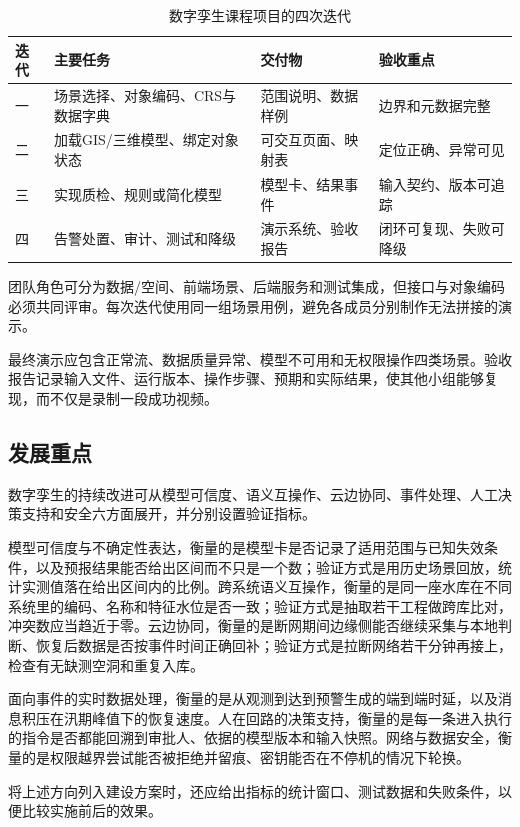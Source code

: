 \begin{table}[htbp]
\centering
\caption{数字孪生课程项目的四次迭代}
\label{tab:dt-course-iterations}
\begin{tabular}{p{1.8cm}p{4.0cm}p{4.1cm}p{3.3cm}}
\toprule
迭代 & 主要任务 & 交付物 & 验收重点 \\
\midrule
一 & 场景选择、对象编码、CRS与数据字典 & 范围说明、数据样例 & 边界和元数据完整 \\
二 & 加载GIS/三维模型、绑定对象状态 & 可交互页面、映射表 & 定位正确、异常可见 \\
三 & 实现质检、规则或简化模型 & 模型卡、结果事件 & 输入契约、版本可追踪 \\
四 & 告警处置、审计、测试和降级 & 演示系统、验收报告 & 闭环可复现、失败可降级 \\
\bottomrule
\end{tabular}
\end{table}

团队角色可分为数据/空间、前端场景、后端服务和测试集成，但接口与对象编码必须共同评审。每次迭代使用同一组场景用例，避免各成员分别制作无法拼接的演示。

最终演示应包含正常流、数据质量异常、模型不可用和无权限操作四类场景。验收报告记录输入文件、运行版本、操作步骤、预期和实际结果，使其他小组能够复现，而不仅是录制一段成功视频。

\subsection{发展重点}

数字孪生的持续改进可从模型可信度、语义互操作、云边协同、事件处理、人工决策支持和安全六方面展开，并分别设置验证指标。

模型可信度与不确定性表达，衡量的是模型卡是否记录了适用范围与已知失效条件，以及预报结果能否给出区间而不只是一个数；验证方式是用历史场景回放，统计实测值落在给出区间内的比例。跨系统语义互操作，衡量的是同一座水库在不同系统里的编码、名称和特征水位是否一致；验证方式是抽取若干工程做跨库比对，冲突数应当趋近于零。云边协同，衡量的是断网期间边缘侧能否继续采集与本地判断、恢复后数据是否按事件时间正确回补；验证方式是拉断网络若干分钟再接上，检查有无缺测空洞和重复入库。

面向事件的实时数据处理，衡量的是从观测到达到预警生成的端到端时延，以及消息积压在汛期峰值下的恢复速度。人在回路的决策支持，衡量的是每一条进入执行的指令是否都能回溯到审批人、依据的模型版本和输入快照。网络与数据安全，衡量的是权限越界尝试能否被拒绝并留痕、密钥能否在不停机的情况下轮换。

将上述方向列入建设方案时，还应给出指标的统计窗口、测试数据和失败条件，以便比较实施前后的效果。

